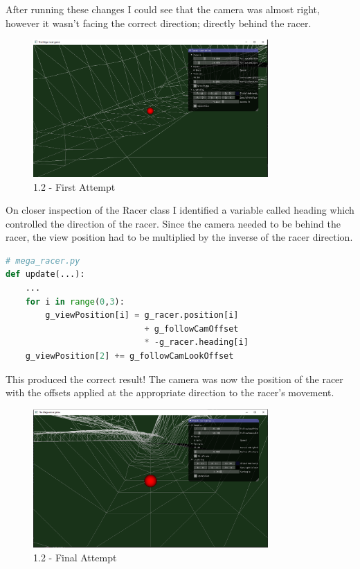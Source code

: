 \documentclass[a4 paper, 12pt]{article}
\begin{document}
After running these changes I could see that the camera was almost right, however it wasn't facing the correct direction; directly behind the racer. 
    \begin{figure} [H]
        \centering
        \includegraphics[width=0.8\textwidth, frame]
            {./images/1.2_a.PNG}
        \caption{1.2 - First Attempt}
    \end{figure}

On closer inspection of the Racer class I identified a variable called heading which controlled the direction of the racer. Since the camera needed to be behind the racer, the view position had to be multiplied by the inverse of the racer direction.
    \begin{lstlisting}[language=python]
# mega_racer.py
def update(...):
    ...        
    for i in range(0,3):
        g_viewPosition[i] = g_racer.position[i] 
                            + g_followCamOffset 
                            * -g_racer.heading[i]
    g_viewPosition[2] += g_followCamLookOffset
    \end{lstlisting}

This produced the correct result! The camera was now the position of the racer with the offsets applied at the appropriate direction to the racer's movement.
    \begin{figure} [H]
        \centering
        \includegraphics[width=0.8\textwidth, frame]
            {./images/1.2_b.PNG}
        \caption{1.2 - Final Attempt}
    \end{figure}  
\end{document}
